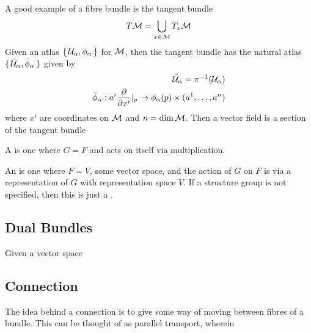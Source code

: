 \documentclass{article}
\begin{document}
\begin{example}
A good example of a fibre bundle is the tangent bundle
\[
T\mathcal{M} = \bigcup_{x\in\mathcal{M}} T_x \mathcal{M}
\]
Given an atlas $\set{\mathcal{U}_\alpha, \phi_\alpha}$ for $\mathcal{M}$, then the tangent bundle has the natural atlas $\set{\bar{\mathcal{U}}_\alpha, \bar{\phi}_\alpha}$ given by 
\begin{align*}
\bar{\mathcal{U}}_\alpha = \pi^{-1}(\mathcal{U}_\alpha) \\
\bar{\phi}_\alpha : a^i \frac{\partial}{\partial x^i} \rvert_p \to \phi_\alpha(p) \times (a^1,\dots,a^n)
\end{align*}
where $x^i$ are coordinates on $\mathcal{M}$ and $n=\dim\mathcal{M}$. Then a vector field is a section of the tangent bundle
\end{example}

\begin{definition}
A  is one where $G=F$ and acts on itself via multiplication. 
\end{definition}

\begin{definition}
An  is one where $F=V$, some vector space, and the action of $G$ on $F$ is via a representation of $G$ with representation space $V$. If a structure group is not specified, then this is just a . 
\end{definition}

\subsection{Dual Bundles}

\begin{idea}
Given a vector space 
\end{idea}

\subsection{Connection}

\begin{idea}
The idea behind a connection is to give some way of moving between fibres of a bundle. This can be thought of as parallel transport, wherein 
\end{idea}
\end{document}
